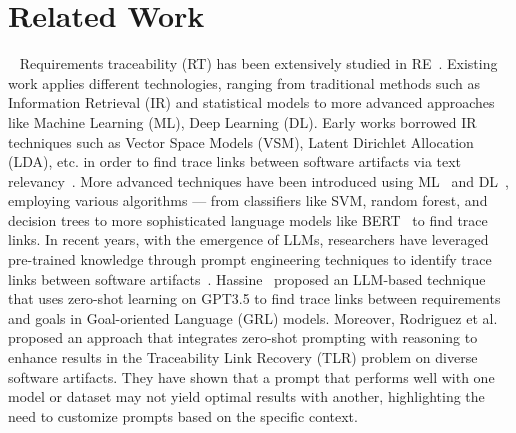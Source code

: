 \section{Related Work}
~\label{sec:related}
Requirements traceability (RT) has been extensively studied in RE~\cite{mucha2024systematic,li2023applications,tufail2017systematic,wang2018requirements,ramesh1998factors}. 
Existing work applies different technologies, ranging from traditional methods such as Information Retrieval (IR) and statistical models to more advanced approaches like Machine Learning (ML), Deep Learning (DL). Early works borrowed IR techniques such as Vector Space Models (VSM), Latent Dirichlet Allocation (LDA), etc. in order to find trace links between software artifacts via text relevancy~\cite{gao2022using, guo2017tackling, kuang2017analyzing, nishikawa2015recovering, panichella2013and, Mahmoud2013, Wang20193, sun2017frlink, capobianco2013improving, chhabra2017filtering, bavota2014enhancing, shao2013improved, Wang20191, Li2020,moran2020improving}.
More advanced techniques have been introduced using ML~\cite{Rasiman2022,Bella2019,mills2019tracing,Bella2018,Mills2018,Rath2018,Zhao2018,Mills2017,Mills20172,Falessi2017,Hayes2015,le2015rclinker,li2015recovering} and DL~\cite{kenton2019bert,Zhang2021,Wang20192,Guo:17,Chen2019,Alhoshan2019,Alhoshan2018,Li2018,zhao2020extended,Sultanov2013}, employing various algorithms — from classifiers like SVM, random forest, and decision trees to more sophisticated language models like BERT~\cite{devlin-etal-2019-bert} to find trace links. 
In recent years, with the emergence of LLMs, researchers have leveraged pre-trained knowledge through prompt engineering techniques to identify trace links between software artifacts~\cite{hassine2024llm,rodriguez2023prompts,vogelsang2025impact}. Hassine~\cite{hassine2024llm} proposed an LLM-based technique that uses zero-shot learning on GPT3.5 to find trace links between requirements and goals in Goal-oriented Language (GRL) models. Moreover, Rodriguez et al.~\cite{rodriguez2023prompts} proposed an approach that integrates zero-shot prompting with reasoning to enhance results in the Traceability Link Recovery (TLR) problem on diverse software artifacts.
They have shown that a prompt that performs well with one model or dataset may not yield optimal results with another, highlighting the need to customize prompts based on the specific context.

